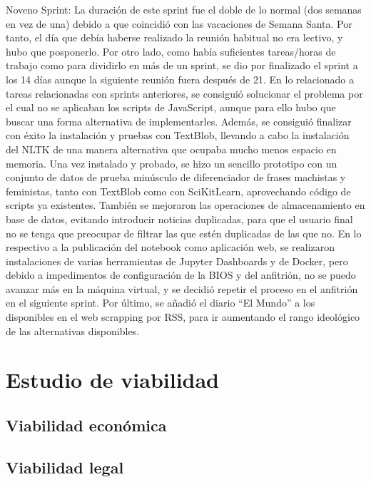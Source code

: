 Noveno Sprint:
La duración de este sprint fue el doble de lo normal (dos semanas en vez de una) debido a que coincidió con las vacaciones de Semana Santa. Por tanto, el día que debía haberse realizado la reunión habitual no era lectivo, y hubo que posponerlo. 
Por otro lado, como había suficientes tareas/horas de trabajo como para dividirlo en más de un sprint, se dio por finalizado el sprint a los 14 días aunque la siguiente reunión fuera después de 21.
En lo relacionado a tareas relacionadas con sprints anteriores, se consiguió solucionar el problema por el cual no se aplicaban los scripts de JavaScript, aunque para ello hubo que buscar una forma alternativa de implementarles.
Además, se consiguió finalizar con éxito la instalación y pruebas con TextBlob, llevando a cabo la instalación del NLTK de una manera alternativa que ocupaba mucho menos espacio en memoria. Una vez instalado y probado, se hizo un sencillo prototipo con un conjunto de datos de prueba minúsculo de diferenciador de frases machistas y feministas, tanto con TextBlob como con SciKitLearn, aprovechando código de scripts ya existentes.
También se mejoraron las operaciones de almacenamiento en base de datos, evitando introducir noticias duplicadas, para que el usuario final no se tenga que preocupar de filtrar las que estén duplicadas de las que no.
En lo respectivo a la publicación del notebook como aplicación web, se realizaron instalaciones de varias herramientas de Jupyter Dashboards y de Docker, pero debido a impedimentos de configuración de la BIOS y del anfitrión, no se puedo avanzar más en la máquina virtual, y se decidió repetir el proceso en el anfitrión en el siguiente sprint.
Por último, se añadió el diario “El Mundo” a los disponibles en el web scrapping por RSS, para ir aumentando el rango ideológico de las alternativas disponibles.


\section{Estudio de viabilidad}

\subsection{Viabilidad económica}

\subsection{Viabilidad legal}


